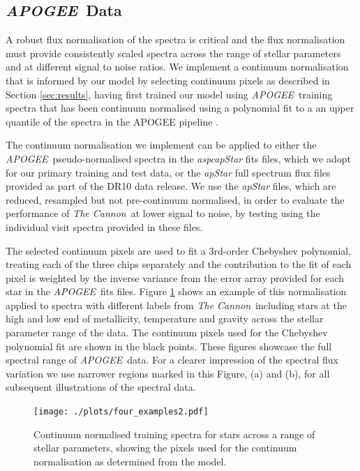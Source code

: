\documentclass[12pt, preprint]{aastex}
\newcommand{\tc}{\textsl{The Cannon}}
\newcommand{\apogee}{\textsl{APOGEE}}
\begin{document}
\subsection{\apogee\ Data}

A robust flux normalisation of the spectra is critical and the flux normalisation must provide consistently scaled spectra across the range of stellar parameters and at different signal to noise ratios. We implement a continuum normalisation that is informed by our model by selecting continuum pixels as described in Section \ref{sec:results}, having first trained our model using \apogee\ training spectra that has been continuum normalised using a polynomial fit to a an upper quantile of the spectra in the APOGEE pipeline \citep{Meszaros2013}. 

The continuum normalisation we implement can be applied to either the \apogee\ pseudo-normalised spectra in the \textit{aspcapStar} fits files, which we adopt for our primary training and test data, or the \textit{apStar} full spectrum flux files provided as part of the DR10 data release. We use the \textit{apStar} files, which are reduced, resampled but not pre-continuum normalised, in order to evaluate the performance of \tc\ at lower signal to noise, by testing using the individual visit spectra provided in these files.  

The selected continuum pixels are used to fit a 3rd-order Chebyshev polynomial, treating each of the three chips separately and the contribution to the fit of each pixel is weighted by the inverse variance from the error array provided for each star in the \apogee\ fits files. Figure \ref{fig:norm} shows an example of this normalisation applied to spectra with different labels from \tc\, including stars at the high and low end of metallicity, temperature and gravity across the stellar parameter range of the data. The continuum pixels used for the Chebyshev polynomial fit are shown in the black points. These figures showcase the full spectral range of \apogee\ data. For a clearer impression of the spectral flux variation we use narrower regions marked in this Figure, (a) and (b), for all subsequent illustrations of the spectral data. 

\begin{figure}[h!]
  \texttt{[image: ./plots/four\_examples2.pdf]}
\caption{Continuum normalised training spectra for stars across a range of stellar parameters, showing the pixels used for the continuum normalisation as determined from the model.}
\label{fig:norm}
\end{figure}
\end{document}
